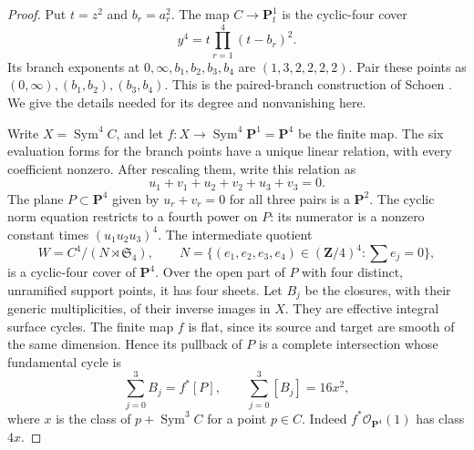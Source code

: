 \documentclass[11pt]{article}
\theoremstyle{definition}
\theoremstyle{remark}
\begin{document}
\begin{proof}
Put $t=z^2$ and $b_r=a_r^2$.  The map $C\to\mathbf P^1_t$ is the
cyclic-four cover
\[
 y^4=t\prod_{r=1}^4(t-b_r)^2.
\]
Its branch exponents at $0,\infty,b_1,b_2,b_3,b_4$ are
$(1,3,2,2,2,2)$.  Pair these points as
$(0,\infty),(b_1,b_2),(b_3,b_4)$.  This is the paired-branch
construction of Schoen \cite[Theorem~2.0, pp.~11--12;
Lemmas~2.3--2.6, pp.~13--17]{Schoen88}.  We give the details needed
for its degree and nonvanishing here.

Write $X=\operatorname{Sym}^4C$, and let
$f:X\to\operatorname{Sym}^4\mathbf P^1=\mathbf P^4$ be the finite
map.  The six evaluation forms for the branch points have a unique linear
relation, with every coefficient nonzero.  After rescaling them, write
this relation as
\[
 u_1+v_1+u_2+v_2+u_3+v_3=0.
\]
The plane $P\subset\mathbf P^4$ given by $u_r+v_r=0$ for all three
pairs is a $\mathbf P^2$.  The cyclic norm equation restricts to a
fourth power on $P$: its numerator is a nonzero constant times
$(u_1u_2u_3)^4$.  The intermediate quotient
\[
 W=C^4/(N\rtimes\mathfrak S_4),\qquad
 N=\{(e_1,e_2,e_3,e_4)\in(\mathbf Z/4)^4:\textstyle\sum e_j=0\},
\]
is a cyclic-four cover of $\mathbf P^4$.  Over the open part of $P$
with four distinct, unramified support points, it has four sheets.
Let $B_j$ be the closures, with their generic multiplicities, of their
inverse images in $X$.  They are effective integral surface cycles.
The finite map $f$ is flat, since its source and target are smooth of
the same dimension.  Hence its pullback of $P$ is a complete intersection
whose fundamental cycle is
\begin{equation}\label{eq:cyclic-four-total}
 \sum_{j=0}^3B_j=f^*[P],\qquad
 \sum_{j=0}^3[B_j]=16x^2,
\end{equation}
where $x$ is the class of $p+\operatorname{Sym}^3C$ for a point $p\in C$.
Indeed $f^*\mathcal O_{\mathbf P^4}(1)$ has class $4x$.


\end{proof}
\end{document}
